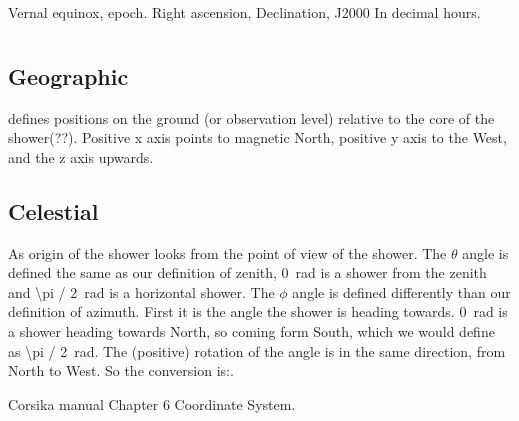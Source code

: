 Vernal equinox, epoch.
Right ascension, Declination, J2000
In decimal hours.


\section{\corsika}

\subsection{Geographic}

\corsika defines positions on the ground (or observation level) relative
to the core of the shower(??). Positive x axis points to magnetic North,
positive y axis to the West, and the z axis upwards.


\subsection{Celestial}

As origin of the shower \corsika looks from the point of view of the
shower. The $\theta$ angle is defined the same as our definition of
zenith, \SI{0}{\radian} is a shower from the zenith and
\SI{\pi / 2}{\radian} is a horizontal shower. The $\phi$ angle is
defined differently than our definition of azimuth. First it is the
angle the shower is heading towards. \SI{0}{\radian} is a shower heading
towards North, so coming form South, which we would define as
\SI{\pi / 2}{\radian}. The (positive) rotation of the angle is
in the same direction, from North to West. So the conversion is:.




\begin{thebibliography}{widest-label}
Corsika manual Chapter 6 Coordinate System.

\end{thebibliography}
